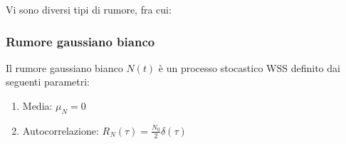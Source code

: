        Vi sono diversi tipi di rumore, fra cui:
        \subsubsection{Rumore gaussiano bianco}
            Il rumore gaussiano bianco $N(t)$ è un processo stocastico WSS definito dai seguenti parametri:
            \begin{enumerate}
                \item Media: $\mu_{N} = 0$
                \item Autocorrelazione: $R_{N}(\tau) = \frac{N_0}{2} \delta(\tau)$
            \end{enumerate}
